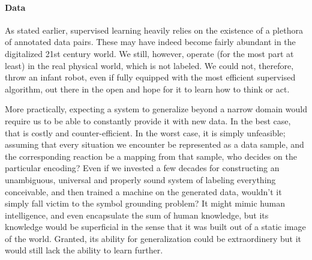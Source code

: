 \documentclass[]{article}
\begin{document}
\paragraph{Data}
As stated earlier, supervised learning heavily relies on the existence of a plethora of annotated data pairs. These may have indeed become fairly abundant in the digitalized 21st century world. We still, however, operate (for the most part at least) in the real physical world, which is not labeled. We could not, therefore, throw an infant robot, even if fully equipped with the most efficient supervised algorithm, out there in the open and hope for it to learn how to think or act. 

More practically, expecting a system to generalize beyond a narrow domain would require us to be able to constantly provide it with new data. In the best case, that is costly and counter-efficient. In the worst case, it is simply unfeasible; assuming that every situation we encounter be represented as a data sample, and the corresponding reaction be a mapping from that sample, who decides on the particular encoding? Even if we invested a few decades for constructing an unambiguous, universal and properly sound system of labeling everything conceivable, and then trained a machine on the generated data, wouldn't it simply fall victim to the symbol grounding problem? It might mimic human intelligence, and even encapsulate the sum of human knowledge, but its knowledge would be superficial in the sense that it was built out of a static image of the world. Granted, its ability for generalization could be extraordinery but it would still lack the ability to learn further. 
\end{document}
